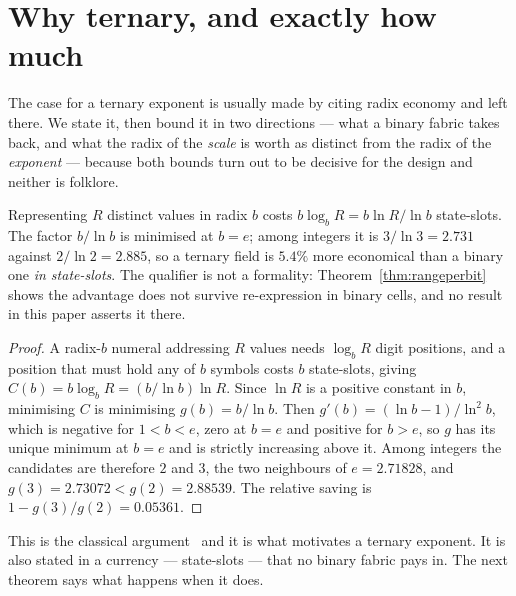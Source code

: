 \section{Why ternary, and exactly how much}\label{sec:whyternary}



The case for a ternary exponent is usually made by citing radix economy and left
there. We state it, then bound it in two directions --- what a binary fabric takes
back, and what the radix of the \emph{scale} is worth as distinct from the radix
of the \emph{exponent} --- because both bounds turn out to be decisive for the
design and neither is folklore.

\begin{theorem}
\label{thm:economy}
Representing $R$ distinct values in radix $b$ costs $b\log_b R = b\ln R/\ln b$
state-slots. The factor $b/\ln b$ is minimised at $b = e$; among integers it is
$3/\ln 3 = 2.731$ against $2/\ln 2 = 2.885$, so a ternary field is $5.4\%$ more
economical than a binary one \emph{in state-slots}. The qualifier is not a
formality: Theorem~\ref{thm:rangeperbit} shows the advantage does not survive
re-expression in binary cells, and no result in this paper asserts it there.
\end{theorem}

\begin{proof}
A radix-$b$ numeral addressing $R$ values needs $\log_b R$ digit positions, and a
position that must hold any of $b$ symbols costs $b$ state-slots, giving
$C(b) = b\log_b R = (b/\ln b)\ln R$. Since $\ln R$ is a positive constant in $b$,
minimising $C$ is minimising $g(b) = b/\ln b$. Then
$g'(b) = (\ln b - 1)/\ln^{2} b$, which is negative for $1 < b < e$, zero at
$b = e$ and positive for $b > e$, so $g$ has its unique minimum at $b = e$ and is
strictly increasing above it. Among integers the candidates are therefore $2$ and
$3$, the two neighbours of $e = 2.71828$, and $g(3) = 2.73072 < g(2) = 2.88539$.
The relative saving is $1 - g(3)/g(2) = 0.05361$.
\end{proof}

This is the classical argument~\cite{hayes2001,radixeconomy} and it is what
motivates a ternary exponent. It is also stated in a currency --- state-slots ---
that no binary fabric pays in. The next theorem says what happens when it does.

